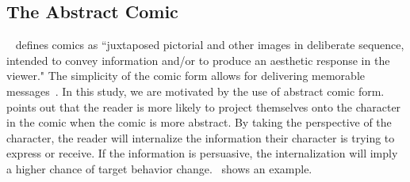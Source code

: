 
\subsection{The Abstract Comic}
~\textcite{scott1993understanding} defines comics as ``juxtaposed pictorial and other images in deliberate sequence, intended to convey information and/or to produce an aesthetic response in the viewer." The simplicity of the comic form allows for delivering memorable messages~\cite{scott1993understanding}. In this study, we are motivated by the use of abstract comic form.~\textcite{scott1993understanding} points out that the reader is more likely to project themselves onto the character in the comic when the comic is more abstract. By taking the perspective of the character, the reader will internalize the information their character is trying to express or receive. If the information is persuasive, the internalization will imply a higher chance of target behavior change.~ shows an example.




